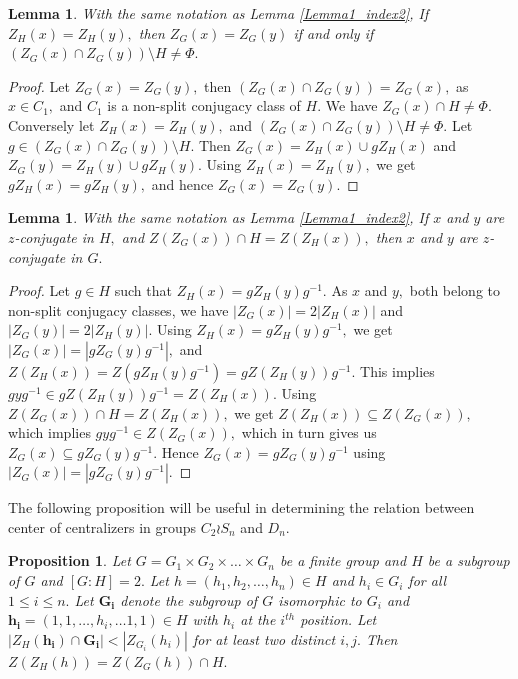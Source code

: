\documentclass[12pt,twoside,reqno]{amsart}
\newtheorem{lemma}[theorem]{Lemma}
\newtheorem{proposition}[theorem]{Proposition}
\theoremstyle{definition}
\numberwithin{equation}{section}
\newcommand{\bmf}[1]{\mathbf{#1}}
\begin{document}
\begin{lemma}\label{Lemma1_index2_converse}
With the same notation as Lemma \ref{Lemma1_index2}, If $Z_H(x)=Z_H(y),$ then $Z_G(x)=Z_G(y)$ if and only if $(Z_G(x)\cap Z_G(y))\setminus H\neq \Phi.$
\end{lemma}
\begin{proof}
Let $Z_G(x)=Z_G(y),$ then $(Z_G(x)\cap Z_G(y))=Z_G(x),$ as $x\in C_1,$ and $C_1$ is a non-split conjugacy class of $H.$ We have $Z_G(x)\cap H \neq \Phi.$
Conversely let $Z_H(x)=Z_H(y),$ and $(Z_G(x)\cap Z_G(y))\setminus H\neq \Phi.$ Let $g \in (Z_G(x)\cap Z_G(y))\setminus H.$ Then $Z_G(x)=Z_H(x)\cup gZ_H(x)$ and $Z_G(y)=Z_H(y)\cup gZ_H(y).$ Using $Z_H(x)=Z_H(y),$ we get $gZ_H(x)=gZ_H(y),$ and hence $Z_G(x)=Z_G(y).$
\end{proof}
\begin{lemma}\label{Lemma2_index2_converse}
With the same notation as Lemma \ref{Lemma1_index2}, If $x$ and $y$ are $z$-conjugate in $H,$ and $Z(Z_G(x))\cap H=Z(Z_H(x)),$ then $x$ and $y$ are $z$-conjugate in $G.$
\end{lemma}
\begin{proof}
    Let $g\in H$ such that $Z_H(x)=gZ_H(y)g^{-1}.$
    As $x$ and $y,$ both belong to non-split conjugacy classes, we have $|Z_G(x)|=2|Z_H(x)|$ and $|Z_G(y)|=2|Z_H(y)|.$ Using $Z_H(x)=gZ_H(y)g^{-1},$ we get $|Z_G(x)|=|gZ_G(y)g^{-1}|,$ and $Z(Z_H(x))=Z(gZ_H(y)g^{-1})=gZ(Z_H(y))g^{-1}.$ This implies $gyg^{-1}\in gZ(Z_H(y))g^{-1}=Z(Z_H(x)). $
    Using $Z(Z_G(x))\cap H=Z(Z_H(x)),$ we get $Z(Z_H(x))\subseteq Z(Z_G(x)),$ which implies $gyg^{-1}\in Z(Z_G(x)),$ which in turn gives us $Z_G(x)\subseteq gZ_G(y)g^{-1}.$ Hence $Z_G(x)=gZ_G(y)g^{-1}$ using $|Z_G(x)|=|gZ_G(y)g^{-1}|.$ 
    \end{proof}
The following proposition will be useful in determining the relation between center of centralizers in groups $C_2 \wr S_n$ and $D_n.$ 

\begin{proposition}\label{Regarding_center_of_centralizers}
 Let $G = G_1 \times G_2 \times \dots \times G_n$ be a finite group and $H$ be a subgroup of $G$ and $[G:H]=2.$ Let $h = (h_1, h_2, \dots , h_n)\in H$ and $h_i\in G_i$ for all $1\leq i\leq n.$ Let $\bmf{G_i}$ denote the subgroup of $G$ isomorphic to $G_i$ and $\bmf{h_i} = (1, 1, \dots, h_i, \dots 1, 1) \in H$ with $h_i$ at the $i^{th}$ position. Let $|Z_H(\bmf{h_i})\cap \bmf{G_i} | < |Z_{G_i}(h_i)|$ for at least two distinct $i, j.$ Then $Z(Z_H(h))=Z(Z_G(h))\cap H.$  
\end{proposition}
\end{document}
